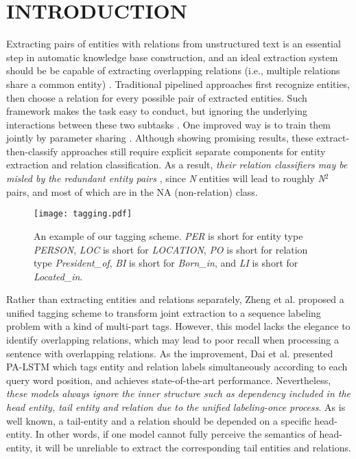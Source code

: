 \documentclass{ecai}
\begin{document}
\section{INTRODUCTION}
Extracting pairs of entities with relations from unstructured text is an essential step in automatic knowledge base construction, and an ideal extraction system should be be capable of extracting overlapping relations (i.e., multiple relations share a common entity) \cite{zeng2018extracting}.
Traditional pipelined approaches first recognize entities, then choose a relation for every possible pair of extracted entities.
Such framework makes the task easy to conduct, but ignoring the underlying interactions between these two subtasks \cite{li2014incremental}.
One improved way is to train them jointly by parameter sharing \cite{fu-etal-2019-graphrel,miwa2016end,sun2019joint}.
Although showing promising results, these extract-then-classify approaches still require explicit separate components for entity extraction and relation classification.
As a result, \emph{their relation classifiers may be misled by the redundant entity pairs} \cite{dai2019joint,tan2019jointly}, since \emph{N} entities will lead to roughly \emph{N}$^2$ pairs, and most of which are in the NA (non-relation) class.

\begin{figure*}
\centerline{\texttt{[image: tagging.pdf]}}
    \caption{An example of our tagging scheme. \emph{PER} is short for entity type \emph{PERSON}, \emph{LOC} is short for \emph{LOCATION}, \emph{PO} is short for relation type \emph{President\_of}, \emph{BI} is short for \emph{Born\_in}, and \emph{LI} is short for \emph{Located\_in}.}\label{fig:tagging}
\end{figure*}

Rather than extracting entities and relations separately, Zheng et al. \cite{zheng2017joint} proposed a unified tagging scheme to transform joint extraction to a sequence labeling problem with a kind of multi-part tags.
However, this model lacks the elegance to identify overlapping relations, which may lead to poor recall when processing a sentence with overlapping relations.
As the improvement, Dai et al. \cite{dai2019joint} presented PA-LSTM which tags entity and relation labels simultaneously according to each query word position, and achieves state-of-the-art performance.
Nevertheless, \emph{these models always ignore the inner structure such as dependency included in the head entity, tail entity and relation due to the unified labeling-once process}.
As is well known, a tail-entity and a relation should be depended on a specific head-entity. 
In other words, if one model cannot fully perceive the semantics of head-entity, it will be unreliable to extract the corresponding tail entities and relations.
\end{document}

